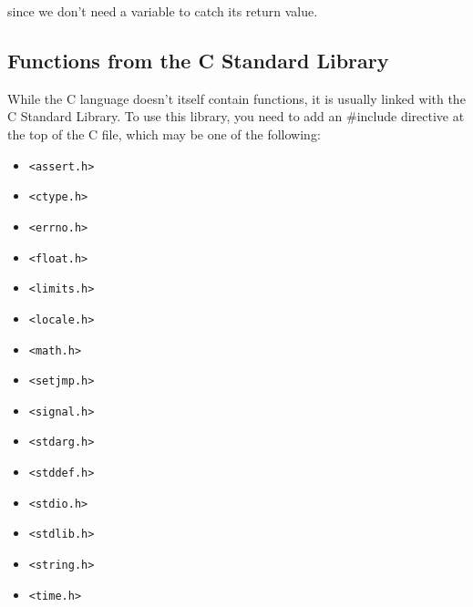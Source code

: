 since we don't need a variable to catch its return value.

\subsection{Functions from the C Standard Library}
While the C language doesn't itself contain functions, it is usually linked
with the C Standard Library. To use this library, you need to add an \#include
directive at the top of the C file, which may be one of the following:
\begin{itemize}
\item \texttt{\textless{}assert.h\textgreater{}}
\item \texttt{\textless{}ctype.h\textgreater{}}
\item \texttt{\textless{}errno.h\textgreater{}}
\item \texttt{\textless{}float.h\textgreater{}}
\end{itemize}
\begin{itemize}
\item \texttt{\textless{}limits.h\textgreater{}}
\item \texttt{\textless{}locale.h\textgreater{}}
\item \texttt{\textless{}math.h\textgreater{}}
\item \texttt{\textless{}setjmp.h\textgreater{}}
\end{itemize}
\begin{itemize}
\item \texttt{\textless{}signal.h\textgreater{}}
\item \texttt{\textless{}stdarg.h\textgreater{}}
\item \texttt{\textless{}stddef.h\textgreater{}}
\item \texttt{\textless{}stdio.h\textgreater{}}
\end{itemize}
\begin{itemize}
\item \texttt{\textless{}stdlib.h\textgreater{}}
\item \texttt{\textless{}string.h\textgreater{}}
\item \texttt{\textless{}time.h\textgreater{}}
\end{itemize}

